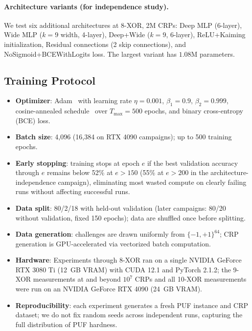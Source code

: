 \paragraph{Architecture variants (for independence study).} We test six
additional architectures at 8-XOR, 2M CRPs: Deep MLP (6-layer), Wide MLP
($k{=}9$ width, 4-layer), Deep+Wide ($k{=}9$, 6-layer), ReLU+Kaiming
initialization, Residual connections (2 skip connections), and
NoSigmoid+BCEWithLogits loss.  The largest variant has $1.08$M parameters.

\subsection{Training Protocol}

\begin{itemize}
\item \textbf{Optimizer}: Adam~\cite{kingma2015adam} with learning rate
  $\eta = 0.001$, $\beta_1 = 0.9$, $\beta_2 = 0.999$, cosine-annealed
  schedule~\cite{loshchilov2017sgdr} over $T_{\max} = 500$ epochs, and
  binary cross-entropy (BCE) loss.
\item \textbf{Batch size}: 4{,}096 (16{,}384 on RTX 4090 campaigns);
  up to 500 training epochs.
\item \textbf{Early stopping}: training stops at epoch $e$ if the best
  validation accuracy through $e$ remains below 52\% at $e > 150$ (55\% at
  $e > 200$ in the architecture-independence campaign), eliminating
  most wasted compute on clearly failing runs without
  affecting successful runs.
\item \textbf{Data split}: 80/2/18 with held-out validation (later
  campaigns: 80/20 without validation, fixed 150 epochs); data are shuffled
  once before splitting.
\item \textbf{Data generation}: challenges are drawn uniformly from
  $\{-1, +1\}^{64}$; CRP generation is GPU-accelerated via vectorized
  batch computation.
\item \textbf{Hardware}: Experiments through 8-XOR ran on a single NVIDIA
  GeForce RTX 3080 Ti (12~GB VRAM) with CUDA 12.1 and PyTorch 2.1.2; the
  9-XOR measurements at and beyond $10^7$ CRPs and all 10-XOR measurements
  were run on an NVIDIA GeForce RTX 4090 (24~GB VRAM).
\item \textbf{Reproducibility}: each experiment generates a fresh PUF
  instance and CRP dataset; we do not fix random seeds across independent
  runs, capturing the full distribution of PUF hardness.
\end{itemize}

